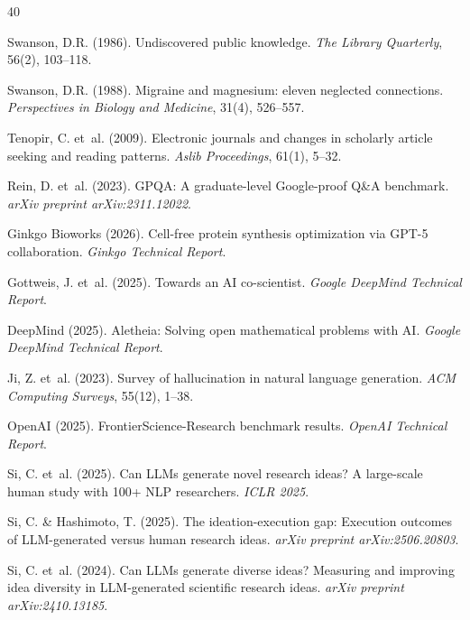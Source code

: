 \documentclass[11pt]{article}
\begin{document}
\begin{thebibliography}{40}

Swanson, D.R. (1986).
Undiscovered public knowledge.
\emph{The Library Quarterly}, 56(2), 103--118.

Swanson, D.R. (1988).
Migraine and magnesium: eleven neglected connections.
\emph{Perspectives in Biology and Medicine}, 31(4), 526--557.

Tenopir, C. et~al. (2009).
Electronic journals and changes in scholarly article seeking and reading patterns.
\emph{Aslib Proceedings}, 61(1), 5--32.

Rein, D. et~al. (2023).
GPQA: A graduate-level Google-proof Q\&A benchmark.
\emph{arXiv preprint arXiv:2311.12022}.

Ginkgo Bioworks (2026).
Cell-free protein synthesis optimization via GPT-5 collaboration.
\emph{Ginkgo Technical Report}.

Gottweis, J. et~al. (2025).
Towards an AI co-scientist.
\emph{Google DeepMind Technical Report}.

DeepMind (2025).
Aletheia: Solving open mathematical problems with AI.
\emph{Google DeepMind Technical Report}.

Ji, Z. et~al. (2023).
Survey of hallucination in natural language generation.
\emph{ACM Computing Surveys}, 55(12), 1--38.

OpenAI (2025).
FrontierScience-Research benchmark results.
\emph{OpenAI Technical Report}.

Si, C. et~al. (2025).
Can LLMs generate novel research ideas? A large-scale human study with 100+ NLP researchers.
\emph{ICLR 2025}.

Si, C. \& Hashimoto, T. (2025).
The ideation-execution gap: Execution outcomes of LLM-generated versus human research ideas.
\emph{arXiv preprint arXiv:2506.20803}.

Si, C. et~al. (2024).
Can LLMs generate diverse ideas? Measuring and improving idea diversity in LLM-generated scientific research ideas.
\emph{arXiv preprint arXiv:2410.13185}.


\end{thebibliography}
\end{document}
